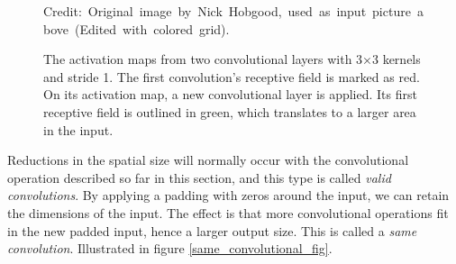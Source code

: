     \begin{figure}[H]
        \centering
        
        
        \caption[Receptive field]{The activation maps from two convolutional layers with 3×3 kernels and stride 1. The first convolution's receptive field is marked as red. On its activation map, a new convolutional layer is applied. Its first receptive field is outlined in green, which translates to a larger area in the input.}
      	\medskip 
        \hspace*{15pt}\hbox{\scriptsize Credit: Original image by Nick Hobgood\cite{clownfish_image}, used as input picture above (Edited with colored grid).}
        \label{receptive_field_fig}
    \end{figure}

    
    Reductions in the spatial size\cite{o2015introduction_convolutions} will normally occur with the convolutional operation described so far in this section, and this type is called \textit{valid convolutions}. By applying a padding with zeros around the input, we can retain the dimensions of the input. The effect is that more convolutional operations fit in the new padded input, hence a larger output size. This is called a \textit{same convolution}. Illustrated in figure \ref{same_convolutional_fig}.
    
